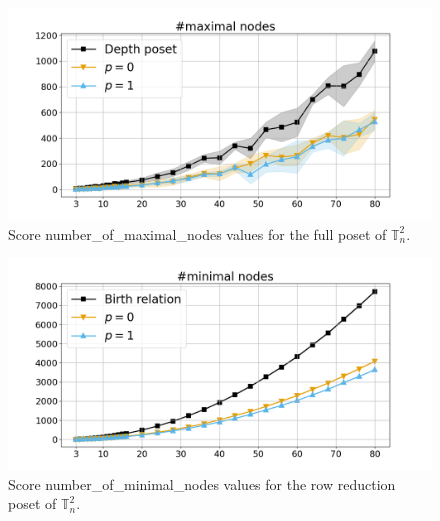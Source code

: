 \documentclass{article}
\begin{document}
    \begin{figure}[h!]
        \centering
        \hspace*{-0.24\textwidth}
        \includegraphics[width=1.4\textwidth]{pics/extended torus scores/score=number-of-maximal-nodes, dim=2, object=full.png}
        \caption{Score number\_of\_maximal\_nodes values for the full poset of $\mathbb{T}_n^{2}$.}
        \label{fig:numberofmaximalnodes-full2}
    \end{figure}
    \begin{figure}[h!]
        \centering
        \hspace*{-0.24\textwidth}
        \includegraphics[width=1.4\textwidth]{pics/extended torus scores/score=number-of-minimal-nodes, dim=2, object=row reduction.png}
        \caption{Score number\_of\_minimal\_nodes values for the row reduction poset of $\mathbb{T}_n^{2}$.}
        \label{fig:numberofminimalnodes-rowreduction2}
    \end{figure}
\end{document}
